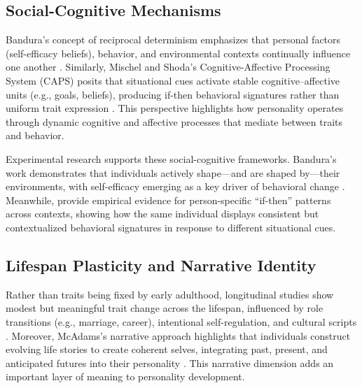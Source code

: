 \documentclass[stu]{apa7}
\begin{document}
\subsection{Social-Cognitive Mechanisms}

Bandura's concept of reciprocal determinism emphasizes that personal factors (self-efficacy beliefs), behavior, and environmental contexts continually influence one another \parencite{bandura1977self}. Similarly, Mischel and Shoda's Cognitive-Affective Processing System (CAPS) posits that situational cues activate stable cognitive–affective units (e.g., goals, beliefs), producing if-then behavioral signatures rather than uniform trait expression \parencite{mischel1995cognitive}. This perspective highlights how personality operates through dynamic cognitive and affective processes that mediate between traits and behavior.

Experimental research supports these social-cognitive frameworks. Bandura's work demonstrates that individuals actively shape—and are shaped by—their environments, with self-efficacy emerging as a key driver of behavioral change \parencite{bandura1977self}. Meanwhile, \textcite{mischel1995cognitive} provide empirical evidence for person-specific ``if-then'' patterns across contexts, showing how the same individual displays consistent but contextualized behavioral signatures in response to different situational cues.

\subsection{Lifespan Plasticity and Narrative Identity}

Rather than traits being fixed by early adulthood, longitudinal studies show modest but meaningful trait change across the lifespan, influenced by role transitions (e.g., marriage, career), intentional self-regulation, and cultural scripts \parencite{roberts2006patterns}. Moreover, McAdams's narrative approach highlights that individuals construct evolving life stories to create coherent selves, integrating past, present, and anticipated futures into their personality \parencite{mcadams2001bad}. This narrative dimension adds an important layer of meaning to personality development.

\end{document}
